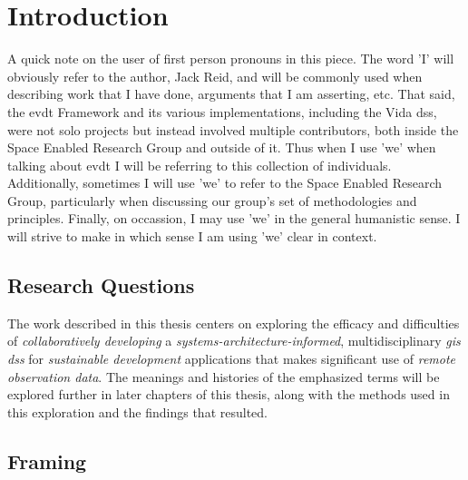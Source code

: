 \chapter{Introduction}

A quick note on the user of first person pronouns in this piece. The word 'I' will obviously refer to the author, Jack Reid, and will be commonly used when describing work that I have done, arguments that I am asserting, etc. That said, the \ac{evdt} Framework and its various implementations, including the Vida \ac{dss}, were not solo projects but instead involved multiple contributors, both inside the Space Enabled Research Group and outside of it. Thus when I use 'we' when talking about \ac{evdt} I will be referring to this collection of individuals. Additionally, sometimes I will use 'we' to refer to the Space Enabled Research Group, particularly when discussing our group's set of methodologies and principles. Finally, on occassion, I may use 'we' in the general humanistic sense. I will strive to make in which sense I am using 'we' clear in context.

\section{Research Questions}

The work described in this thesis centers on exploring the efficacy and difficulties of \textit{collaboratively developing} a \textit{systems-architecture-informed}, multidisciplinary \textit{\ac{gis} \ac{dss}} for \textit{sustainable development} applications that makes significant use of \textit{remote observation data}. The meanings and histories of the emphasized terms will be explored further in later chapters of this thesis, along with the methods used in this exploration and the findings that resulted.

\section{Framing}

